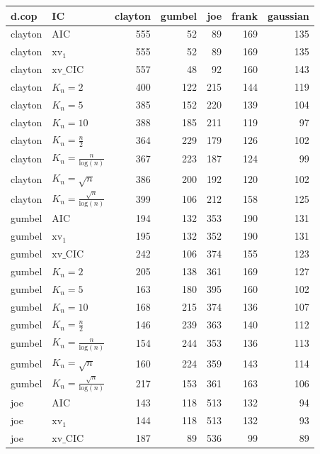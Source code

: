 \begin{table}[htbp]
\centering
\begin{tabular}{llrrrrr}
  \hline
d.cop & IC & clayton & gumbel & joe & frank & gaussian \\ 
  \hline
clayton & AIC & 555 & 52 & 89 & 169 & 135 \\ 
  clayton & $\text{xv}_{1}$ & 555 & 52 & 89 & 169 & 135 \\ 
  clayton & $\text{xv}\_\text{CIC}$ & 557 & 48 & 92 & 160 & 143 \\ 
  clayton & $K_{n}=2$ & 400 & 122 & 215 & 144 & 119 \\ 
  clayton & $K_{n}=5$ & 385 & 152 & 220 & 139 & 104 \\ 
  clayton & $K_{n}=10$ & 388 & 185 & 211 & 119 & 97 \\ 
  clayton & $K_{n}=\tfrac{n}{2}$ & 364 & 229 & 179 & 126 & 102 \\ 
  clayton & $K_{n}=\tfrac{n}{\text{log}(n)}$ & 367 & 223 & 187 & 124 & 99 \\ 
  clayton & $K_{n}=\sqrt{n}$ & 386 & 200 & 192 & 120 & 102 \\ 
  clayton & $K_{n}=\tfrac{\sqrt{n}}{\text{log}(n)}$ & 399 & 106 & 212 & 158 & 125 \\ 
   \hdashline
gumbel & AIC & 194 & 132 & 353 & 190 & 131 \\ 
  gumbel & $\text{xv}_{1}$ & 195 & 132 & 352 & 190 & 131 \\ 
  gumbel & $\text{xv}\_\text{CIC}$ & 242 & 106 & 374 & 155 & 123 \\ 
  gumbel & $K_{n}=2$ & 205 & 138 & 361 & 169 & 127 \\ 
  gumbel & $K_{n}=5$ & 163 & 180 & 395 & 160 & 102 \\ 
  gumbel & $K_{n}=10$ & 168 & 215 & 374 & 136 & 107 \\ 
  gumbel & $K_{n}=\tfrac{n}{2}$ & 146 & 239 & 363 & 140 & 112 \\ 
  gumbel & $K_{n}=\tfrac{n}{\text{log}(n)}$ & 154 & 244 & 353 & 136 & 113 \\ 
  gumbel & $K_{n}=\sqrt{n}$ & 160 & 224 & 359 & 143 & 114 \\ 
  gumbel & $K_{n}=\tfrac{\sqrt{n}}{\text{log}(n)}$ & 217 & 153 & 361 & 163 & 106 \\ 
   \hdashline
joe & AIC & 143 & 118 & 513 & 132 & 94 \\ 
  joe & $\text{xv}_{1}$ & 144 & 118 & 513 & 132 & 93 \\ 
  joe & $\text{xv}\_\text{CIC}$ & 187 & 89 & 536 & 99 & 89 \\ 

\end{tabular}
\end{table}
